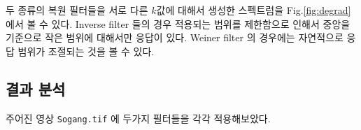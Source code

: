 \documentclass[a4paper, 12p]{paper}
\def\code#1{\texttt{#1}}
\begin{document}
두 종류의 복원 필터들을 서로 다른 $k$값에 대해서 생성한 스펙트럼을 Fig.\ref{fig:degrad} 에서 볼 수 있다. Inverse filter 들의 경우 적용되는 범위를 제한함으로 인해서 중앙을 기준으로 작은 범위에 대해서만 응답이 있다. Weiner filter 의 경우에는 자연적으로 응답 범위가 조절되는 것을 볼 수 있다.

\subsection{결과 분석}
주어진 영상 \code{Sogang.tif} 에 두가지 필터들을 각각 적용해보았다.

\begin{figure}[htbp]
\centering
{}
\subfigure[Weiner, $k=0.00025$]{
}
\end{figure}
\end{document}
